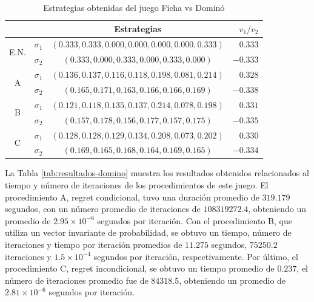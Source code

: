 \begin{table}[hbt!]
    \centering
    \begin{tabular}{c c|c|r}
        & & Estrategias & $v_1 / v_2$\\
        \hline
        \multirow{2}{*}{E.N.}
        & $\sigma_1$ & $(0.333, 0.333, 0.000, 0.000, 0.000, 0.000, 0.333)$ & $0.333$ \\
        & $\sigma_2$ & $(0.333, 0.000, 0.333, 0.000, 0.333, 0.000)$ &  $-0.333$\\
        \hline
        \multirow{2}{*}{A}
        & $\sigma_1$ & $(0.136, 0.137, 0.116, 0.118, 0.198, 0.081, 0.214)$ & $0.328$ \\
        & $\sigma_2$ & $(0.165, 0.171, 0.163, 0.166, 0.166, 0.169)$ & $-0.338$\\
        \hline
        \multirow{2}{*}{B}
        & $\sigma_1$ & $(0.121, 0.118, 0.135, 0.137, 0.214, 0.078, 0.198)$ & $0.331$ \\
        & $\sigma_2$ & $(0.157, 0.178, 0.156, 0.177, 0.157, 0.175)$ & $-0.335$\\
        \hline
        \multirow{2}{*}{C}
        & $\sigma_1$ & $(0.128, 0.128, 0.129, 0.134, 0.208, 0.073, 0.202)$ & $0.330$ \\
        & $\sigma_2$ & $(0.169, 0.165, 0.168, 0.164, 0.169, 0.165)$ & $-0.334$\\
        \hline
    \end{tabular}
    \caption{Estrategias obtenidas del juego Ficha vs Dominó}
    \label{tab:estrategias-domino}
\end{table}

La Tabla \ref{tab:resultados-domino} muestra los resultados obtenidos relacionados al tiempo y número de iteraciones de los procedimientos de este juego. El procedimiento A, regret condicional, tuvo una duración promedio de $319.179$ segundos, con un número promedio de iteraciones de $108319272.4$, obteniendo un promedio de $2.95 {\times} 10^{-6}$ segundos por iteración. Con el procedimiento B, que utiliza un vector invariante de probabilidad, se obtuvo un tiempo, número de iteraciones y tiempo por iteración promedios de $11.275$ segundos, $75250.2$ iteraciones y $1.5 {\times} 10^{-4}$ segundos por iteración, respectivamente. Por último, el procedimiento C, regret incondicional, se obtuvo un tiempo promedio de $0.237$, el número de iteraciones promedio fue de $84318.5$, obteniendo un promedio de $2.81 {\times} 10^{-6}$ segundos por iteración. 

